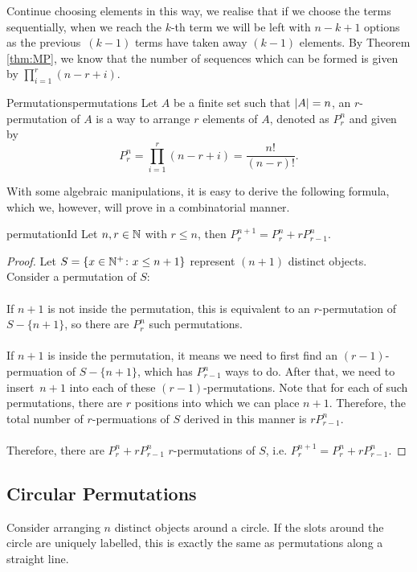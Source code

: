 \documentclass[math]{amznotes}
\theoremstyle{remark}
\begin{document}
Continue choosing elements in this way, we realise that if we choose the terms sequentially, when we reach the $k$-th term we will be left with $n - k + 1$ options as the previous~$(k - 1)$ terms have taken away $(k - 1)$ elements. By Theorem \ref{thm:MP}, we know that the number of sequences which can be formed is given by $\prod_{i = 1}^{r}(n - r + i)$.
\begin{dfnbox}{Permutations}{permutations}
    Let $A$ be a finite set such that ${\left\lvert {A} \right\rvert} = n$, an $r$-permutation of $A$ is a way to arrange $r$ elements of $A$, denoted as $P^n_r$ and given by
    \begin{equation*}
        P^n_r = \prod_{i = 1}^{r}(n - r + i) = \frac{n!}{(n - r)!}.
    \end{equation*}
\end{dfnbox}
With some algebraic manipulations, it is easy to derive the following formula, which we, however, will prove in a combinatorial manner.
\begin{thmbox}{}{permutationId}
    Let $n, r \in \mathbb{N}$ with $r \leq n$, then $P^{n + 1}_r = P^n_r + rP^n_{r - 1}$.
    \tcblower
    \begin{proof}
        Let $S = \left\{x \in \mathbb{N}^+ \colon x \leq n + 1\right\}$ represent $(n + 1)$ distinct objects. Consider a permutation of $S$:
        \\\\
        If $n + 1$ is not inside the permutation, this is equivalent to an $r$-permutation of~$S - \{n + 1\}$, so there are $P^n_r$ such permutations.
        \\\\
    If $n + 1$ is inside the permutation, it means we need to first find an $(r - 1)$-permuation of $S - \{n + 1\}$, which has $P^n_{r - 1}$ ways to do. After that, we need to insert~$n + 1$ into each of these $(r - 1)$-permutations. Note that for each of such permutations, there are $r$ positions into which we can place $n + 1$. Therefore, the total number of $r$-permuations of $S$ derived in this manner is $rP^n_{r - 1}$.
        \\\\
        Therefore, there are $P^n_{r} + rP^n_{r - 1}$ $r$-permutations of $S$, i.e. $P^{n + 1}_r = P^n_r + rP^n_{r - 1}$. 
    \end{proof}
\end{thmbox}

\subsection{Circular Permutations}
Consider arranging $n$ distinct objects around a circle. If the slots around the circle are uniquely labelled, this is exactly the same as permutations along a straight line.
\end{document}
